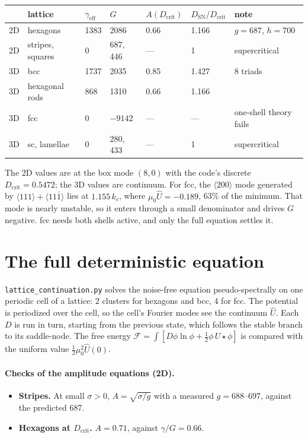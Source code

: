 \documentclass[11pt]{article}
\newcommand{\code}[1]{\texttt{#1}}
\newcommand{\Uh}{\hat U}
\newcommand{\Dc}{D_{\mathrm{crit}}}
\newcommand{\Dsn}{D_{\mathrm{SN}}}
\begin{document}
\begin{center}
\begin{tabular}{@{}lllllll@{}}
\toprule
& lattice & $\gamma_{\mathrm{eff}}$ & $G$ & $A(\Dc)$ & $\Dsn/\Dc$ & note \\
\midrule
2D & hexagons & 1383 & 2086 & 0.66 & 1.166 & $g=687$, $h=700$ \\
2D & stripes, squares & 0 & 687, 446 & --- & 1 & supercritical \\
3D & bcc & 1737 & 2035 & 0.85 & 1.427 & 8 triads \\
3D & hexagonal rods & 868 & 1310 & 0.66 & 1.166 & \\
3D & fcc & 0 & $-9142$ & --- & --- & one-shell theory fails \\
3D & sc, lamellae & 0 & 280, 433 & --- & 1 & supercritical \\
\bottomrule
\end{tabular}
\end{center}
The 2D values are at the box mode $(8,0)$ with the code's discrete
$\Dc=0.5472$; the 3D values are continuum. For fcc, the $\langle200\rangle$ mode
generated by $\langle111\rangle+\langle11\bar1\rangle$ lies at $1.155\,k_c$,
where $\mu_0\Uh=-0.189$, 63\% of the minimum. That mode is nearly unstable, so
it enters through a small denominator and drives $G$ negative. fcc needs both
shells active, and only the full equation settles it.

\section{The full deterministic equation}\label{sec:cont}
\code{lattice\_continuation.py} solves the noise-free equation
pseudo-spectrally on one periodic cell of a lattice: 2 clusters for hexagons
and bcc, 4 for fcc. The potential is periodized over the cell, so the cell's
Fourier modes see the continuum $\Uh$. Each $D$ is run in turn, starting from
the previous state, which follows the stable branch to its saddle-node. The
free energy
$\mathcal F=\int[D\phi\ln\phi+\tfrac12\phi\,U\star\phi]$ is compared with the
uniform value $\tfrac12\mu_0^2\Uh(0)$.

\paragraph{Checks of the amplitude equations (2D).}
\begin{itemize}
  \item \textbf{Stripes.} At small $\sigma>0$, $A=\sqrt{\sigma/g}$ with a
        measured $g=688$--$697$, against the predicted 687.
  \item \textbf{Hexagons at $\Dc$.} $A=0.71$, against $\gamma/G=0.66$.
\end{itemize}
\end{document}
